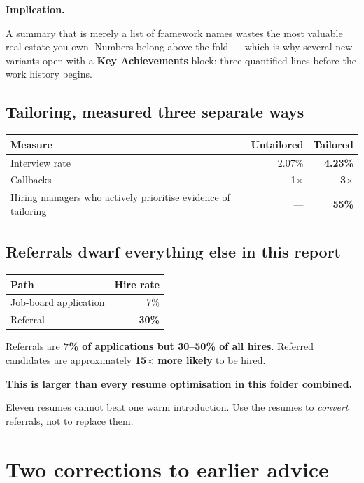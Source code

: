 \documentclass[11pt,a4paper]{article}
\newcommand{\keyfinding}[1]{\par\vspace{3pt}\noindent\textcolor{warn}{\textbf{#1}}\par\vspace{2pt}}
\begin{document}
\keyfinding{Implication.}
A summary that is merely a list of framework names wastes the most valuable real estate you
own. Numbers belong above the fold --- which is why several new variants open with a
\textbf{Key Achievements} block: three quantified lines before the work history begins.

\subsection{Tailoring, measured three separate ways}

\begin{center}
\begin{tabular}{l r r}
\hline
\textbf{Measure} & \textbf{Untailored} & \textbf{Tailored} \\
\hline
Interview rate & 2.07\% & \textbf{4.23\%} \\
Callbacks & 1$\times$ & \textbf{3$\times$} \\
Hiring managers who actively prioritise evidence of tailoring & --- & \textbf{55\%} \\
\hline
\end{tabular}
\end{center}

\subsection{Referrals dwarf everything else in this report}

\begin{center}
\begin{tabular}{l r}
\hline
\textbf{Path} & \textbf{Hire rate} \\
\hline
Job-board application & 7\% \\
Referral & \textbf{30\%} \\
\hline
\end{tabular}
\end{center}

Referrals are \textbf{7\% of applications but 30--50\% of all hires}. Referred candidates are
approximately \textbf{15$\times$ more likely} to be hired.

\keyfinding{This is larger than every resume optimisation in this folder combined.}
Eleven resumes cannot beat one warm introduction. Use the resumes to \emph{convert} referrals,
not to replace them.

\section{Two corrections to earlier advice}
\end{document}

